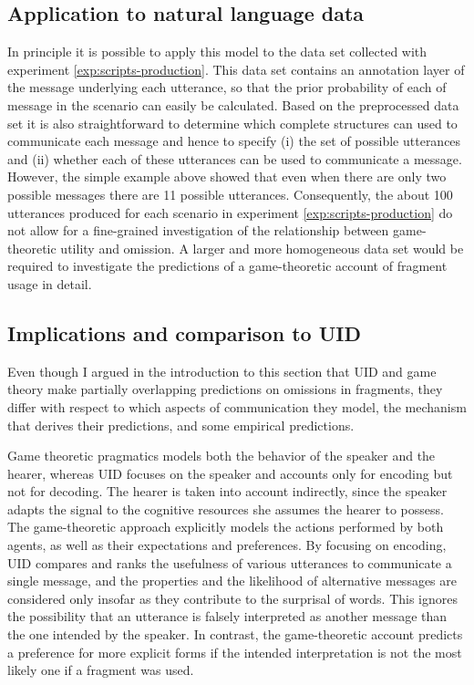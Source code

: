 \subsection{Application to natural language data}
In principle it is possible to apply this model to the data set collected with experiment \ref{exp:scripts-production}. This data set contains an annotation layer of the message underlying each utterance, so that the prior probability of each of message in the scenario can easily be calculated. Based on the preprocessed data set it is also straightforward to determine which complete structures can used to communicate each message and hence to specify (i) the set of possible utterances and (ii) whether each of these utterances can be used to communicate a message. However, the simple example above showed that even when there are only two possible messages there are 11 possible utterances. Consequently, the about 100 utterances produced for each scenario in experiment \ref{exp:scripts-production} do not allow for a fine-grained investigation of the relationship between game-theoretic utility and omission. A larger and more homogeneous data set would be required to investigate the predictions of a game-theoretic account of fragment usage in detail.

\subsection{Implications and comparison to UID}
Even though I argued in the introduction to this section that UID and game theory make partially overlapping predictions on omissions in fragments, they differ with respect to which aspects of communication they model, the mechanism that derives their predictions, and some empirical predictions.

Game theoretic pragmatics models both the behavior of the speaker and the hearer, whereas UID focuses on the speaker and accounts only for encoding but not for decoding. The hearer is taken into account indirectly, since the speaker adapts the signal to the cognitive resources she assumes the hearer to possess. The game-theoretic approach explicitly models the actions performed by both agents, as well as their expectations and preferences. By focusing on encoding, UID compares and ranks the usefulness of various utterances to communicate a single message, and the properties and the likelihood of alternative messages are considered only insofar as they contribute to the surprisal of words. This ignores the possibility that an utterance is falsely interpreted as another message than the one intended by the speaker. In contrast, the game-theoretic account predicts a preference for more explicit forms if the intended interpretation is not the most likely one if a fragment was used.

